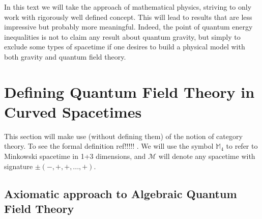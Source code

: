 \documentclass[a4paper,11pt]{article}
\numberwithin{equation}{section}
\theoremstyle{definition}
\begin{document}
In this \color{red} text \color{black} we will take the approach of mathematical physics, striving to only work with rigorously well defined concept. This will lead to results that are less impressive but probably more meaningful. Indeed, the point of quantum energy inequalities is not to claim any result about quantum gravity, but simply to exclude some types of spacetime if one desires to build a physical model with both gravity and quantum field theory. 
\newpage
\tableofcontents
\newpage
\section{Defining Quantum Field Theory in Curved Spacetimes}
This section will make use (without defining them) of the notion of category theory. To see the formal definition \color{red} ref!!!!! \color{black}. We will use the symbol $\mathbb{M}_4$ to refer to Minkowski spacetime in 1+3 dimensions, and $\mathcal{M}$ will denote any spacetime with signature $\pm (-, +,+, ..., +)$.

\subsection{Axiomatic approach to Algebraic Quantum Field Theory}
\end{document}
